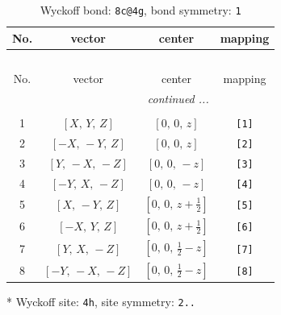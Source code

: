 \documentclass[fleqn,8pt]{jsarticle}
\begin{document}
\renewcommand{\arraystretch}{1.2}
\begin{longtable}{cccc}
\caption{Wyckoff bond: {\tt 8c@4g}, bond symmetry: {\tt 1}}
 \\
 \hline \hline
No. & vector & center & mapping \\ \hline \endfirsthead

\multicolumn{3}{l}{\tablename\ \thetable{}} \\
 \hline \hline
No. & vector & center & mapping \\ \hline \endhead

 \hline \hline
\multicolumn{3}{r}{\footnotesize\it continued ...} \\ \endfoot

 \hline \hline
\multicolumn{3}{r}{} \\ \endlastfoot

1 & $\left[ X,\, Y,\, Z \right]$ & $\left[ 0,\, 0,\, z \right]$ & {\tt [1]} \\ \hline
2 & $\left[ - X,\, - Y,\, Z \right]$ & $\left[ 0,\, 0,\, z \right]$ & {\tt [2]} \\ \hline
3 & $\left[ Y,\, - X,\, - Z \right]$ & $\left[ 0,\, 0,\, - z \right]$ & {\tt [3]} \\ \hline
4 & $\left[ - Y,\, X,\, - Z \right]$ & $\left[ 0,\, 0,\, - z \right]$ & {\tt [4]} \\ \hline
5 & $\left[ X,\, - Y,\, Z \right]$ & $\left[ 0,\, 0,\, z + \frac{1}{2} \right]$ & {\tt [5]} \\ \hline
6 & $\left[ - X,\, Y,\, Z \right]$ & $\left[ 0,\, 0,\, z + \frac{1}{2} \right]$ & {\tt [6]} \\ \hline
7 & $\left[ Y,\, X,\, - Z \right]$ & $\left[ 0,\, 0,\, \frac{1}{2} - z \right]$ & {\tt [7]} \\ \hline
8 & $\left[ - Y,\, - X,\, - Z \right]$ & $\left[ 0,\, 0,\, \frac{1}{2} - z \right]$ & {\tt [8]} \\
\end{longtable}
* Wyckoff site: {\tt 4h}, site symmetry: {\tt 2..}
\renewcommand{\arraystretch}{1.2}
\end{document}
